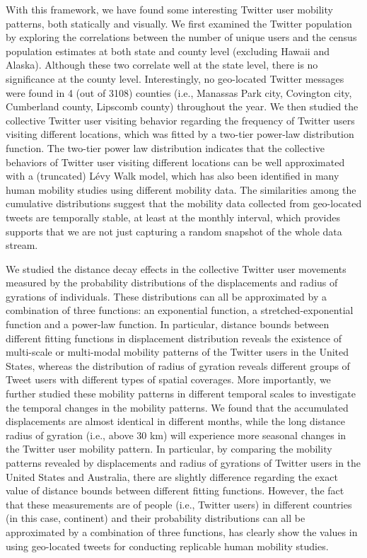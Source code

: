 \documentclass[a4paper, 11pt]{article}
\begin{document}
With this framework, we have found some interesting Twitter user mobility patterns, both statically and visually.
We first examined the Twitter population by exploring the correlations between the number of unique users and the census population estimates at both state and county level (excluding Hawaii and Alaska). 
Although these two correlate well at the state level, there is no significance at the county level. 
Interestingly, no geo-located Twitter messages were found in 4 (out of 3108) counties (i.e., Manassas Park city, Covington city, Cumberland county, Lipscomb county) throughout the year.
We then studied the collective Twitter user visiting behavior regarding the frequency of Twitter users visiting different locations, which was fitted by a two-tier power-law distribution function.
The two-tier power law distribution indicates that the collective behaviors of Twitter user visiting different locations can be well approximated with a (truncated) L\'{e}vy Walk model, which has also been identified in many human mobility studies using different mobility data.
The similarities among the cumulative distributions suggest that the mobility data collected from geo-located tweets are temporally stable, at least at the monthly interval, which provides supports that we are not just capturing a random snapshot of the whole data stream. 

We studied the distance decay effects in the collective Twitter user movements measured by the probability distributions of the displacements and radius of gyrations of individuals. 
These distributions can all be approximated by a combination of three functions: an exponential function, a stretched-exponential function and a power-law function. In particular, distance bounds between different fitting functions in displacement distribution reveals the existence of multi-scale or multi-modal mobility patterns of the Twitter users in the United States, whereas the distribution of radius of gyration reveals different groups of Tweet users with different types of spatial coverages.   
More importantly, we further studied these mobility patterns in different temporal scales to investigate the temporal changes in the mobility patterns. 
We found that the accumulated displacements are almost identical in different months, while the long distance radius of gyration (i.e., above 30 km) will experience more seasonal changes in the Twitter user mobility pattern.
In particular, by comparing the mobility patterns revealed by displacements and radius of gyrations of Twitter users in the United States and Australia, there are slightly difference regarding the exact value of distance bounds between different fitting functions. 
However, the fact that these measurements are of people (i.e., Twitter users) in different countries (in this case, continent) and their probability distributions can all be approximated by a combination of three functions, has clearly show the values in using geo-located tweets for conducting replicable human mobility studies. 


\cleardoublepage
%



\end{document}
